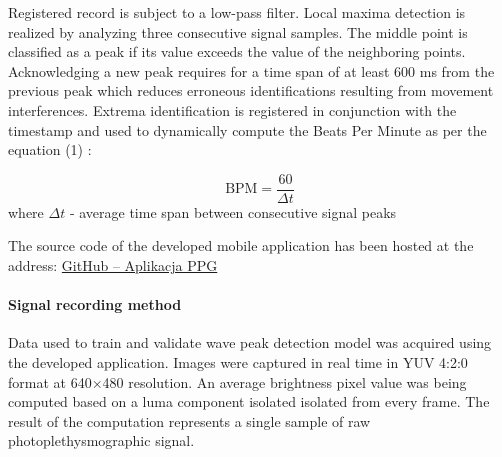 \documentclass[journal]{IEEEtran}
\begin{document}
Registered record is subject to a low-pass filter. Local maxima detection is realized by analyzing three consecutive signal samples. The middle point is classified as a peak if its value exceeds the value of the neighboring points. Acknowledging a new peak requires for a time span of at least 600 ms from the previous peak which reduces erroneous identifications resulting from movement interferences. Extrema identification is registered in conjunction with the timestamp and used to dynamically compute the Beats Per Minute as per the equation (1) :

\begin{equation}
\text{BPM} = \frac{60}{\Delta t}
\label{eq:bpm}
\end{equation}
where $\Delta t$  - average time span between consecutive signal peaks

The source code of the developed mobile application has been hosted at the address:
\href{https://github.com/JanBancerewicz/PPGbetter}{GitHub – Aplikacja PPG}

\newpage
\paragraph{Signal recording method}
Data used to train and validate wave peak detection model was acquired using the developed application. Images were captured in real time in YUV 4:2:0 format at 640×480 resolution. An average brightness pixel value was being computed based on a luma component isolated isolated from every frame. The result of the computation represents a single sample of raw photoplethysmographic signal.
\end{document}
